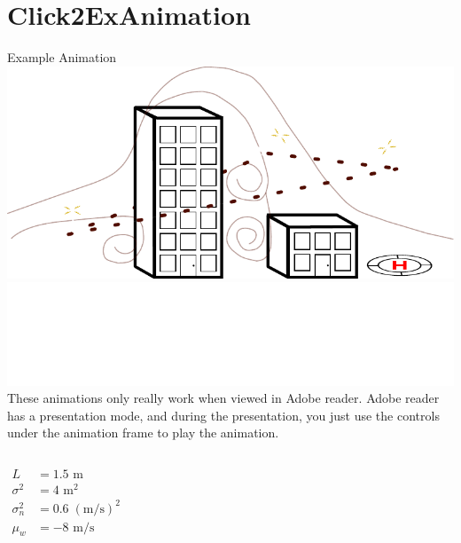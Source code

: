 
\section{Click2ExAnimation}
\begin{frame}{Example Animation \hfill \includegraphics[height=.7cm]{figs/exTopicLogo.pdf} \;\;\;\;\; \includegraphics[height=.5cm]{figs/uncc/whiteUNCCLogo.eps}}
    These animations only really work when viewed in Adobe reader.  Adobe reader has a presentation mode, and during the presentation, you just use the controls under the animation frame to play the animation.

    \begin{columns}[T,onlytextwidth]
            \begin{align*}
                L &= 1.5 \text{ m} \\
                \sigma^{2} &= 4 \text{ m}^{2}\\
                \sigma_{n}^{2} &= 0.6 \; (\text{m/s})^{2} \\
                \mu_{w} &= -8 \text{ m/s}
            \end{align*}
    \end{columns}
\end{frame}
